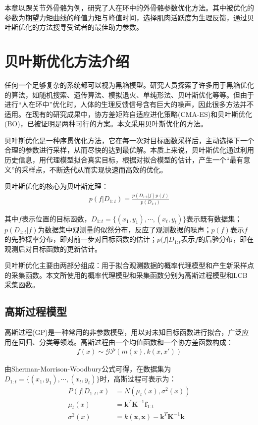 本章以踝关节外骨骼为例，研究了人在环中的外骨骼参数优化方法。其中被优化的参数为期望力矩曲线的峰值力矩与峰值时间，选择肌肉活跃度为生理反馈，通过贝叶斯优化的方法搜寻受试者的最佳助力参数。

\section{贝叶斯优化方法介绍}

任何一个足够复杂的系统都可以视为黑箱模型。研究人员探索了许多用于黑箱优化的算法\cite{p48}，如随机搜索、遗传算法、模拟退火、单纯形法、贝叶斯优化等等。但由于进行“人在环中”优化时，人体的生理反馈信号含有巨大的噪声，因此很多方法并不适用。在现有的研究成果中，协方差矩阵自适应进化策略\cite{p40}(CMA-ES)和贝叶斯优化\cite{p41}(BO)，已被证明是两种可行的方案。本文采用贝叶斯优化的方法。

贝叶斯优化是一种序贯优化方法，它在每一次对目标函数采样后，主动选择下一个合理的参数进行采样，从而尽快的达到最优解。本质上来说，贝叶斯优化通过利用历史信息，用代理模型拟合真实目标，根据对拟合模型的估计，产生一个“最有意义”的采样点，不断迭代从而实现快速而高效的优化。

贝叶斯优化的核心为贝叶斯定理：
\begin{align}
    p(f|D_{1:t})=\frac{p(D_{1:t}|f)p(f)}{p(D_{1:t})}
\end{align}

其中$f$表示位置的目标函数，$D_{1:t} = \{(x_1,y_1),\cdots,(x_t,y_t)\}$表示既有数据集；$p(D_{1:t}|f)$为数据集中观测量的似然分布，反应了观测数据的噪声；$p(f)$表示$f$的先验概率分布，即对前一步对目标函数的估计；$p(f|D_{1:t}$表示$f$的后验分布，即在观测后对目标函数的更新估计。

贝叶斯优化主要由两部分组成：用于拟合观测数据的概率代理模型和产生新采样点的采集函数。本文所使用的概率代理模型和采集函数分别为高斯过程模型和LCB采集函数。

\subsection{高斯过程模型}

高斯过程(GP)是一种常用的非参数模型，用以对未知目标函数进行拟合，广泛应用在回归、分类等领域。高斯过程由一个均值函数和一个协方差函数构成：
\begin{align}
    f(x)\sim \mathcal{GP}(m(x),k(x,x'))
\end{align}

由Sherman-Morrison-Woodbury公式\cite{p49}可得，在数据集为$D_{1:t} = \{(x_1,y_1),\cdots,(x_t,y_t)\}$时，高斯过程可表示为：
\begin{align}
    P(f|D_{1:t},x) &= N(\mu_t(x),\sigma^2(x)) \\
    \mu_t(x) &= \mathbf{k}^T\mathbf{K}^{-1}\mathbf{f}_{1:t} \\
    \sigma^2(x) &= k(\mathbf{x},\mathbf{x}) - \mathbf{k}^T\mathbf{K}^{-1}\mathbf{k}
\end{align}

